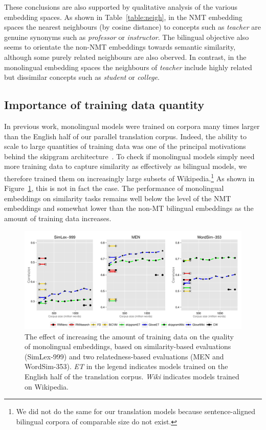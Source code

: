 These conclusions are also supported by qualitative analysis of the various embedding spaces. As shown in Table~\ref{table:neigh}, in the NMT embedding spaces the nearest neighbours (by cosine distance) to concepts such as \emph{teacher} are genuine synonyms such as \emph{professor} or \emph{instructor}. The bilingual objective also seems to orientate the non-NMT embeddings towards semantic similarity, although some purely related neighbours are also oberved. In contrast, in the monolingual embedding spaces the neighbours of \emph{teacher} include  highly related but dissimilar concepts such as \emph{student} or \emph{college}. 

 
\subsection{Importance of training data quantity}

In previous work, monolingual models were trained on corpora many times larger than the English half of our parallel translation corpus. Indeed, the ability to scale to large quantities of training data was one of the principal motivations behind the skipgram architecture~\cite{mikolov2013distributed}. To check if monolingual models simply need more training data to capture similarity as effectively as bilingual models, we therefore trained them on increasingly large subsets of Wikipedia.\footnote{We did not do the same for our translation models because sentence-aligned bilingual corpora of comparable size do not exist.} As shown in Figure~\ref{fig:size}, this is not in fact the case. The performance of monolingual embeddings on similarity tasks remains well below the level of the NMT embeddings and somewhat lower than the non-MT bilingual embeddings as the amount of training data increases. 

\begin{figure}[h]
\includegraphics[width = \textwidth,clip=True,trim=0 10 0 10]{Chapter_3/Figure_1_ICLR2015}
\vspace{-4mm}
\caption{The effect of increasing the amount of training data on the quality of monolingual embeddings, based on similarity-based evaluations (SimLex-999) and two relatedness-based evaluations (MEN and WordSim-353). \emph{ET} in the legend indicates models trained on the English half of the translation corpus. \emph{Wiki} indicates models trained on Wikipedia.}
\label{fig:size}
\end{figure}


